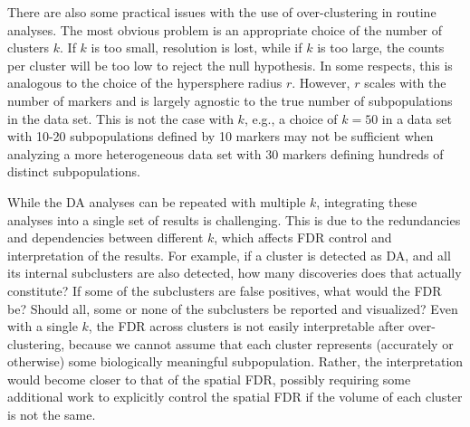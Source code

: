 \documentclass{article}
\begin{document}
There are also some practical issues with the use of over-clustering in routine analyses.
The most obvious problem is an appropriate choice of the number of clusters $k$.
If $k$ is too small, resolution is lost, while if $k$ is too large, the counts per cluster will be too low to reject the null hypothesis.
In some respects, this is analogous to the choice of the hypersphere radius $r$.
However, $r$ scales with the number of markers and is largely agnostic to the true number of subpopulations in the data set.
This is not the case with $k$, e.g., a choice of $k=50$ in a data set with 10-20 subpopulations defined by 10 markers may not be sufficient when analyzing a more heterogeneous data set with 30 markers defining hundreds of distinct subpopulations.

While the DA analyses can be repeated with multiple $k$, integrating these analyses into a single set of results is challenging.
This is due to the redundancies and dependencies between different $k$, which affects FDR control and interpretation of the results.
For example, if a cluster is detected as DA, and all its internal subclusters are also detected, how many discoveries does that actually constitute?
If some of the subclusters are false positives, what would the FDR be?
Should all, some or none of the subclusters be reported and visualized?
Even with a single $k$, the FDR across clusters is not easily interpretable after over-clustering, because we cannot assume that each cluster represents (accurately or otherwise) some biologically meaningful subpopulation.
Rather, the interpretation would become closer to that of the spatial FDR, possibly requiring some additional work to explicitly control the spatial FDR if the volume of each cluster is not the same.




\newpage
\end{document}
